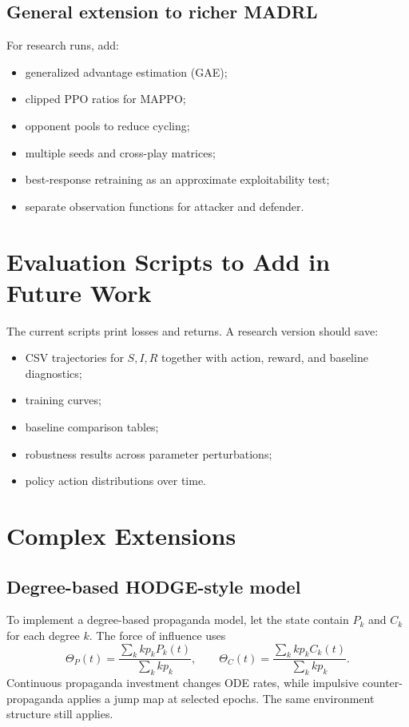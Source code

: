 \documentclass[11pt,a4paper]{article}
\begin{document}
\subsection{General extension to richer MADRL}
For research runs, add:
\begin{itemize}
\item generalized advantage estimation (GAE);
\item clipped PPO ratios for MAPPO;
\item opponent pools to reduce cycling;
\item multiple seeds and cross-play matrices;
\item best-response retraining as an approximate exploitability test;
\item separate observation functions for attacker and defender.
\end{itemize}

\section{Evaluation Scripts to Add in Future Work}
The current scripts print losses and returns. A research version should save:
\begin{itemize}
\item CSV trajectories for $S,I,R$ together with action, reward, and baseline diagnostics;
\item training curves;
\item baseline comparison tables;
\item robustness results across parameter perturbations;
\item policy action distributions over time.
\end{itemize}

\section{Complex Extensions}
\subsection{Degree-based HODGE-style model}
To implement a degree-based propaganda model, let the state contain $P_k$ and $C_k$ for each degree $k$. The force of influence uses
\begin{equation}
\Theta_P(t)=\frac{\sum_k k p_k P_k(t)}{\sum_k k p_k},\qquad
\Theta_C(t)=\frac{\sum_k k p_k C_k(t)}{\sum_k k p_k}.
\end{equation}
Continuous propaganda investment changes ODE rates, while impulsive counter-propaganda applies a jump map at selected epochs. The same environment structure still applies.
\end{document}
